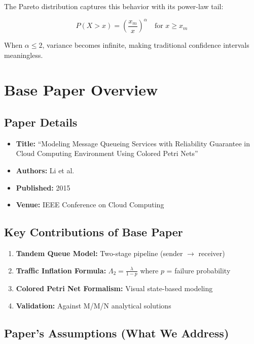 \documentclass[11pt,a4paper]{article}
\begin{document}
The Pareto distribution captures this behavior with its power-law tail:

\begin{equation}
P(X > x) = \left(\frac{x_m}{x}\right)^\alpha \quad \text{for } x \geq x_m
\end{equation}

When $\alpha \leq 2$, variance becomes infinite, making traditional confidence intervals meaningless.


\section{Base Paper Overview}

\subsection{Paper Details}

\begin{itemize}
    \item \textbf{Title:} ``Modeling Message Queueing Services with Reliability Guarantee in Cloud Computing Environment Using Colored Petri Nets''
    \item \textbf{Authors:} Li et al.
    \item \textbf{Published:} 2015
    \item \textbf{Venue:} IEEE Conference on Cloud Computing
\end{itemize}

\subsection{Key Contributions of Base Paper}

\begin{enumerate}
    \item \textbf{Tandem Queue Model:} Two-stage pipeline (sender $\rightarrow$ receiver)
    \item \textbf{Traffic Inflation Formula:} $\Lambda_2 = \frac{\lambda}{1-p}$ where $p$ = failure probability
    \item \textbf{Colored Petri Net Formalism:} Visual state-based modeling
    \item \textbf{Validation:} Against M/M/N analytical solutions
\end{enumerate}

\subsection{Paper's Assumptions (What We Address)}
\end{document}
